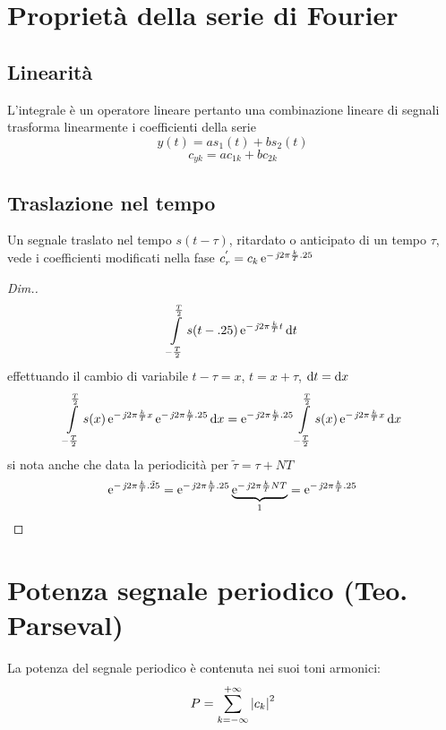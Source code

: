 \section{Proprietà della serie di Fourier}
\subsection{Linearità}L'integrale è un operatore lineare pertanto una combinazione lineare di segnali trasforma linearmente i coefficienti della serie
\[ y(t)=a s_1(t)+ b s_2(t)\]  
\[ c_{y k}= a c_{1 k} + b c_{2 k} \]

\subsection{Traslazione nel tempo}
Un segnale traslato nel tempo $s(t-\tau)$, ritardato o anticipato di un tempo $\tau$, vede i coefficienti modificati nella fase $c_r^{'}=c_k \operatorname{e}^{-\operatorname{\mathit{j}\!} 2\pi\frac{k}{T}.25}$

\begin{proof}[Dim.]
\[ \int\limits_{-\frac{T}{2}}^{\frac{T}{2}}{s(t-.25)\operatorname{e}^{-\operatorname{\mathit{j}\!} 2\pi\frac{k}{T}t}}{\,\mathop{}\!\mathrm{d}{t}} \]
effettuando il cambio di variabile $t-\tau=x$, $t=x+\tau$, $\mathop{}\!\mathrm{d} t=\mathop{}\!\mathrm{d} x$
\[\int\limits_{-\frac{T}{2}}^{\frac{T}{2}}{s(x)\operatorname{e}^{-\operatorname{\mathit{j}\!} 2\pi\frac{k}{T}x}\operatorname{e}^{-\operatorname{\mathit{j}\!} 2\pi\frac{k}{T}.25}}{\,\mathop{}\!\mathrm{d}{x}} =
\operatorname{e}^{-\operatorname{\mathit{j}\!} 2\pi\frac{k}{T}.25} \int\limits_{-\frac{T}{2}}^{\frac{T}{2}}{s(x)\operatorname{e}^{-\operatorname{\mathit{j}\!} 2\pi\frac{k}{T}x}}{\,\mathop{}\!\mathrm{d}{x}}\]
si nota anche che data la periodicità per $\tilde{\tau}=\tau+N T$
\[\operatorname{e}^{-\operatorname{\mathit{j}\!} 2\pi\frac{k}{T}\tilde{.25}}=
\operatorname{e}^{-\operatorname{\mathit{j}\!} 2\pi\frac{k}{T}.25} \underbrace{\operatorname{e}^{-\operatorname{\mathit{j}\!} 2\pi\frac{k}{T}N T}}_{1}=\operatorname{e}^{-\operatorname{\mathit{j}\!} 2\pi\frac{k}{T}.25}
\]
\end{proof}

\section{Potenza segnale periodico (Teo. Parseval)}
La potenza del segnale periodico è contenuta nei suoi toni armonici:
\begin{equation}\label{eq:teo_Parseval}\index{Teorema!Parseval}
P=\sum_{k=-\infty}^{+\infty}{\abs{c_k}^2}
\end{equation}

